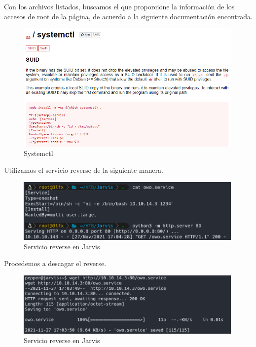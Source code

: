         \large{Con los archivos listados, buscamos el que proporcione la información de los accesos de root de la página, de acuerdo a la siguiente documentación encontrada.}
        \par
        \begin{figure}[H]
            \centering
            \includegraphics[width=0.99\textwidth]{imagenes/jarvis/21_systemctl.png}
            \caption{Systemctl}
        \end{figure}

        \large{Utilizamos el servicio reverse de la siguiente manera.}
        \par
        \begin{figure}[H]
            \centering
            \includegraphics[width=0.99\textwidth]{imagenes/jarvis/22_servicio_reverse_jarvis.png}
            \caption{Servicio reverse en Jarvis}
        \end{figure}

        \large{Procedemos a descagar el reverse.}
        \par
        \begin{figure}[H]
            \centering
            \includegraphics[width=0.99\textwidth]{imagenes/jarvis/23_descarga_reverse_jarvis.png}
            \caption{Servicio reverse en Jarvis}
        \end{figure}

